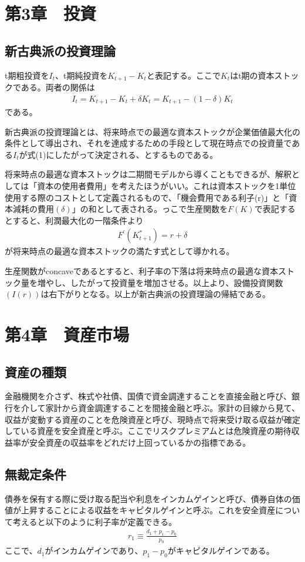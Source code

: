 \documentclass{jsarticle}
\begin{document}
\section{第3章　投資}
\subsection{新古典派の投資理論}
t期粗投資を$I_t$、t期純投資を$K_{t+1} - K_t$と表記する。ここで$K_t$はt期の資本ストックである。両者の関係は
\begin{align}
	I_t = K_{t+1} - K_t + \delta K_t = K_{t+1} -(1 - \delta)K_t
\end{align}
である。

新古典派の投資理論とは、将来時点での最適な資本ストックが企業価値最大化の条件として導出され、それを達成するための手段として現在時点での投資量である$I_t$が式(1)にしたがって決定される、とするものである。

将来時点の最適な資本ストックは二期間モデルから導くこともできるが、解釈としては「資本の使用者費用」を考えたほうがいい。これは資本ストックを1単位使用する際のコストとして定義されるもので、「機会費用である利子(r)」と「資本減耗の費用$(\delta)$」の和として表される。っこで生産関数を$F(K)$で表記するとすると、利潤最大化の一階条件より
\begin{align}
	F^{'}(K_{t+1}^*) = r + \delta
\end{align}
が将来時点の最適な資本ストックの満たす式として導かれる。

生産関数がconcaveであるとすると、利子率の下落は将来時点の最適な資本ストック量を増やし、したがって投資量を増加させる。以上より、設備投資関数$(I(r))$は右下がりとなる。以上が新古典派の投資理論の帰結である。

\section{第4章　資産市場}
\subsection{資産の種類}
金融機関を介さず、株式や社債、国債で資金調達することを直接金融と呼び、銀行を介して家計から資金調達することを間接金融と呼ぶ。家計の目線から見て、収益が変動する資産のことを危険資産と呼び、現時点で将来受け取る収益が確定している資産を安全資産と呼ぶ。ここでリスクプレミアムとは危険資産の期待収益率が安全資産の収益率をどれだけ上回っているかの指標である。
\subsection{無裁定条件}
債券を保有する際に受け取る配当や利息をインカムゲインと呼び、債券自体の価値が上昇することによる収益をキャピタルゲインと呼ぶ。これを安全資産について考えると以下のように利子率が定義できる。
\begin{align}
	r_1 \equiv \frac{d_1 + p_1 -p_0}{p_0}
\end{align}
ここで、$d_1$がインカムゲインであり、$p_1 - p_0$がキャピタルゲインである。
\end{document}
